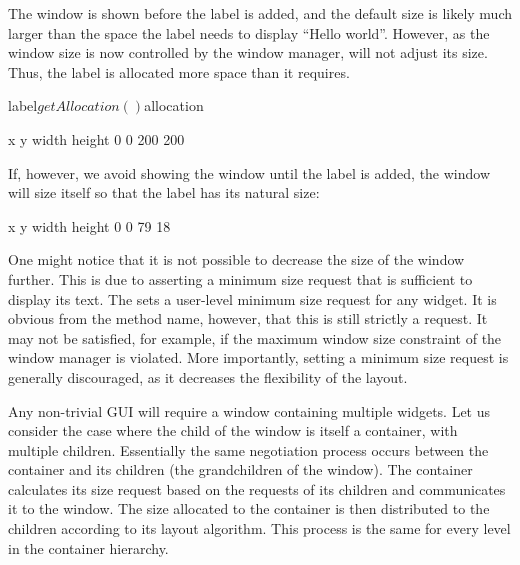 %
The window is shown before the label is added, and the default size is
likely much larger than the space the label needs to display ``Hello
world''. However, as the window size is now controlled by the window
manager,  will not adjust its size. Thus, the label
is allocated more space than it requires.
\begin{Schunk}
\begin{Sinput}
 label$getAllocation()$allocation
\end{Sinput}
\end{Schunk}
\begin{Soutput}
     x      y  width height 
     0      0    200    200 
\end{Soutput}
%
If, however, we avoid showing the window until the label is added, the
window will size itself so that the label has its natural size:
\begin{Schunk}
\end{Schunk}
\begin{Schunk}
\begin{Soutput}
     x      y  width height 
     0      0     79     18 
\end{Soutput}
\end{Schunk}
%
One might notice that it is not possible to decrease the size of the
window further. This is due to  asserting a minimum
size request that is sufficient to display its text. The
 sets a user-level minimum size 
request for any widget. It is obvious from the method name, however,
that this is still strictly a request. It may not be satisfied, for
example, if the maximum window size constraint of the window manager
is violated. More importantly, setting a minimum size request is
generally discouraged, as it decreases the flexibility of the layout.

Any non-trivial GUI will require a window containing multiple
widgets. Let us consider the case where the child of the window is
itself a container, with multiple children.  Essentially the same
negotiation process occurs between the container and its children (the
grandchildren of the window). The container calculates its size
request based on the requests of its children and communicates it to
the window. The size allocated to the container is then distributed to
the children according to its layout algorithm. This process is the
same for every level in the container hierarchy.

